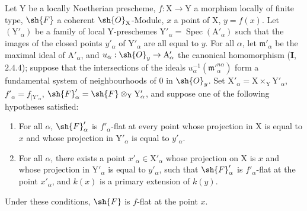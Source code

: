\begin{theorem}[11.5.1]
\label{IV.11.5.1}
Let $\mathrm{Y}$ be a locally Noetherian prescheme, $f:\mathrm{X}\to\mathrm{Y}$ a
morphism locally of finite type, $\sh{F}$ a coherent $\sh{O}_\mathrm{X}$-Module, $x$ a point of $\mathrm{X}$, $y=f(x)$. Let $(\mathrm{Y}'_\alpha)$
be a family of local $\mathrm{Y}$-preschemes $\mathrm{Y}'_\alpha=\operatorname{Spec}(\mathrm{A}'_\alpha)$ such that the images of the closed points $y'_\alpha$
of $\mathrm{Y}'_\alpha$ are all equal to $y$. For all $\alpha$, let $\mathfrak{m}'_\alpha$ be the maximal ideal of $\mathrm{A}'_\alpha$, and $u_\alpha:\sh{O}_y\to\mathrm{A}'_\alpha$
the canonical homomorphism (\textbf{I},~$2.4.4$); suppose that the intersections of the ideals $u_\alpha^{-1}(\mathfrak{m}'^{n\alpha}_\alpha)$
form a fundamental system of neighbourhoods of $0$ in $\sh{O}_y$. Set $\mathrm{X}'_\alpha=\mathrm{X}\times_\mathrm{Y}\mathrm{Y}'_\alpha$, $f'_\alpha=f_{|\mathrm{Y}'_\alpha}$,
$\sh{F}'_\alpha=\sh{F}\otimes_\mathrm{Y}\mathrm{Y}'_\alpha$, and suppose one of the following hypotheses satisfied:
\begin{enumerate}[label=(\roman*)]
  \item For all $\alpha$, $\sh{F}'_\alpha$ is $f'_\alpha$-flat at every point whose projection in $\mathrm{X}$ is equal
  to $x$ and whose projection in $\mathrm{Y}'_\alpha$ is equal to $y'_\alpha$.
  \item For all $\alpha$, there exists a point $x'_\alpha\in\mathrm{X}'_\alpha$ whose projection on $\mathrm{X}$ is $x$ and whose projection in $\mathrm{Y}'_\alpha$
  is equal to $y'_\alpha$, such that $\sh{F}'_\alpha$ is $f'_\alpha$-flat at the point $x'_\alpha$, and $k(x)$ is a primary extension of $k(y)$.
\end{enumerate}

Under these conditions, $\sh{F}$ is $f$-flat at the point $x$.
\end{theorem}

